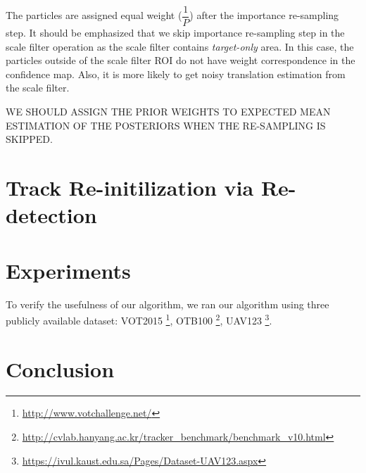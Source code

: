 \documentclass[10pt,twocolumn,letterpaper]{article}
\newcounter{ct}
\begin{document}
The particles are assigned equal weight ($\dfrac{1}{P}$) after the
importance re-sampling step. It should be emphasized that we skip
importance re-sampling step in the scale filter operation as the scale
filter contains \textit{target-only} area. In this case, the particles
outside of the scale filter ROI do not have weight correspondence in
the confidence map. Also, it is more likely to get noisy translation
estimation from the scale filter.

WE SHOULD ASSIGN THE PRIOR WEIGHTS TO EXPECTED MEAN ESTIMATION OF THE
POSTERIORS WHEN THE RE-SAMPLING IS SKIPPED.
\section{Track Re-initilization via Re-detection}
\label{sc:Re-initialization}


\section{Experiments} \label{sc:Experiments}
To verify the usefulness of our algorithm, we ran our algorithm using
three publicly available dataset:
VOT2015 \footnote{\url{http://www.votchallenge.net/}},
OTB100 \footnote{\url{http://cvlab.hanyang.ac.kr/tracker_benchmark/benchmark_v10.html}},
UAV123 \footnote{\url{https://ivul.kaust.edu.sa/Pages/Dataset-UAV123.aspx}}\cite{mueller2016uav123}.

\section{Conclusion} \label{sc:Conclusion}


\small


\end{document}
